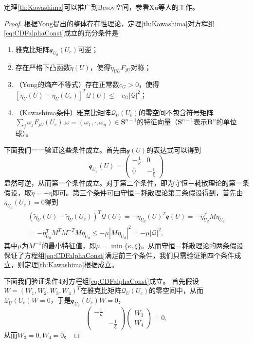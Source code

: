 	\begin{remark}
	定理\ref{th:Kawashima}可以推广到Besov空间，参看Xu等人的工作\cite{xu2014global,xu2014optimal}。
	\end{remark}

	\begin{proof}
		根据Yong提出的整体存在性理论\cite{yong2004entropy}，定理\ref{th:Kawashima}对方程组\eqref{eq:CDFalphaConst}成立的充分条件是
		\begin{enumerate}
			\item 雅克比矩阵$\mathcal{q}_{U_d}(U_e)$可逆；
			\item 存在严格下凸函数$\tilde{\eta}(U)$，使得$\tilde{\eta}_{UU}F_{jU}$对称；
			\item （Yong的熵产不等式）存在正常数$c_G >0$，使得$[\tilde{\eta}_{U}(U) - \tilde{\eta}_{U}(U_e)]^T \mathcal{Q}(U) \le - c_G |\mathcal{Q}|^2$；
			\item （Kawashima条件）雅克比矩阵$\mathcal{Q}_U(U_e)$的零空间不包含符号矩阵$\sum_{j} \omega_j F_{jU}(U_e)$,$ \omega =(\omega_1, \cdot,\omega_n) \in \mathbf{S}^{n-1}$的特征向量（$\mathbf{S}^{n-1}$表示$\mathbf{R}^n$的单位球）。
		\end{enumerate}

		下面我们一一验证这些条件成立。首先由$\mathcal{q}(U)$的表达式可以得到
		\begin{equation*}
			\mathcal{q}_{U_d}(U) = \left( \begin{array}{cc} 
				-\frac{1}{\kappa} & 0 \\
				0 & -\frac{1}{\xi}
			\end{array}\right)
		\end{equation*}
		显然可逆，从而第一个条件成立。对于第二个条件，即为守恒－耗散理论的第一条假设，取$\tilde{\eta} = -\eta$即可。第三个条件可由守恒－耗散理论第二条假设得到，首先由$\eta_{U_d}(U_e) = 0$得到
		\begin{eqnarray*}
			(\tilde{\eta}_{U}(U) - \tilde{\eta}_{U}(U_e))^T \mathcal{Q}(U) = -\eta_{U_d}(U)^T  \mathcal{q}(U) = -\eta_{U_d}^T M \eta_{U_d} \\
			= -\eta_{U_d}^T M^T M^{-T} M \eta_{U_d} \le -\mu |M\eta_{U_d}|^2 = - \mu |\mathcal{Q}|^2 ,
		\end{eqnarray*}
	其中$\mu$为$M^{-1}$的最小特征值，即$\mu= \min\{\kappa, \xi\}$。从而守恒－耗散理论的两条假设保证了方程组\eqref{eq:CDFalphaConst}满足前三个条件，我们只需验证第四个条件成立，则定理\eqref{th:Kawashima}根据\cite{yong2004entropy}成立。

	下面我们验证条件4对方程组\eqref{eq:CDFalphaConst}成立。
	首先假设$W = (W_1,W_2,W_3,W_4)^T$在雅克比矩阵$\mathcal{Q}_U(U_e)$的零空间中，从而$\mathcal{Q}_U(U_e) W = 0$，于是$\mathcal{q}_{U_d}(U_e) W=0$，
	\begin{equation*}
		\left( \begin{array}{cc} 
		-\frac{1}{\kappa} & \\
		&　-\frac{1}{\xi} 
		\end{array} \right) 
		\left( \begin{array}{c} W_3 \\W_4 \end{array} \right) = 0,
	\end{equation*}
	从而$W_3=0,W_4=0$。


\end{proof}
